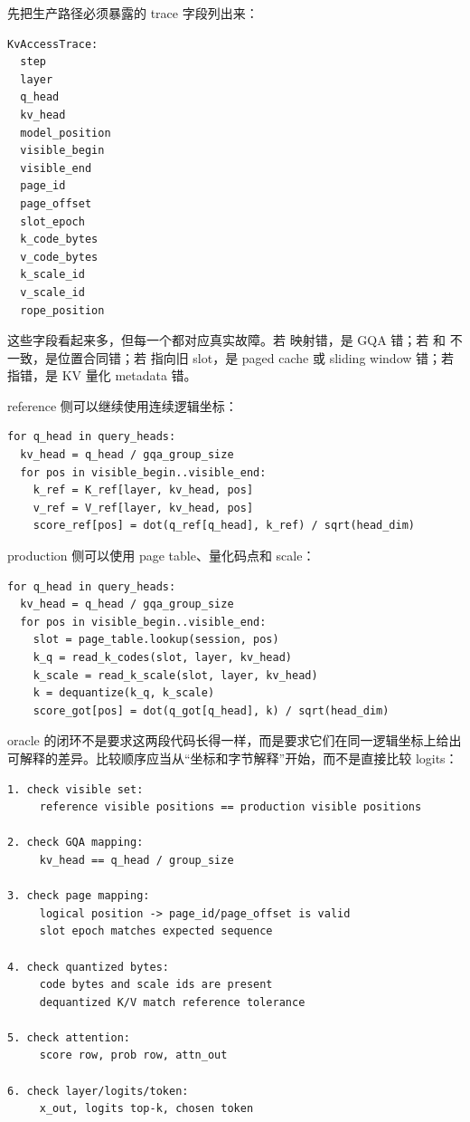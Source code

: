 先把生产路径必须暴露的 trace 字段列出来：

\begin{lstlisting}[numbers=none,caption={paged quantized KV 的最小 trace 字段}]
KvAccessTrace:
  step
  layer
  q_head
  kv_head
  model_position
  visible_begin
  visible_end
  page_id
  page_offset
  slot_epoch
  k_code_bytes
  v_code_bytes
  k_scale_id
  v_scale_id
  rope_position
\end{lstlisting}

这些字段看起来多，但每一个都对应真实故障。若  映射错，是 GQA 错；若  和  不一致，是位置合同错；若  指向旧 slot，是 paged cache 或 sliding window 错；若  指错，是 KV 量化 metadata 错。

reference 侧可以继续使用连续逻辑坐标：

\begin{lstlisting}[numbers=none,caption={reference KV 逻辑读}]
for q_head in query_heads:
  kv_head = q_head / gqa_group_size
  for pos in visible_begin..visible_end:
    k_ref = K_ref[layer, kv_head, pos]
    v_ref = V_ref[layer, kv_head, pos]
    score_ref[pos] = dot(q_ref[q_head], k_ref) / sqrt(head_dim)
\end{lstlisting}

production 侧可以使用 page table、量化码点和 scale：

\begin{lstlisting}[numbers=none,caption={production KV 物理读}]
for q_head in query_heads:
  kv_head = q_head / gqa_group_size
  for pos in visible_begin..visible_end:
    slot = page_table.lookup(session, pos)
    k_q = read_k_codes(slot, layer, kv_head)
    k_scale = read_k_scale(slot, layer, kv_head)
    k = dequantize(k_q, k_scale)
    score_got[pos] = dot(q_got[q_head], k) / sqrt(head_dim)
\end{lstlisting}

oracle 的闭环不是要求这两段代码长得一样，而是要求它们在同一逻辑坐标上给出可解释的差异。比较顺序应当从“坐标和字节解释”开始，而不是直接比较 logits：

\begin{lstlisting}[numbers=none,caption={paged KV oracle 的比较顺序}]
1. check visible set:
     reference visible positions == production visible positions

2. check GQA mapping:
     kv_head == q_head / group_size

3. check page mapping:
     logical position -> page_id/page_offset is valid
     slot epoch matches expected sequence

4. check quantized bytes:
     code bytes and scale ids are present
     dequantized K/V match reference tolerance

5. check attention:
     score row, prob row, attn_out

6. check layer/logits/token:
     x_out, logits top-k, chosen token
\end{lstlisting}


